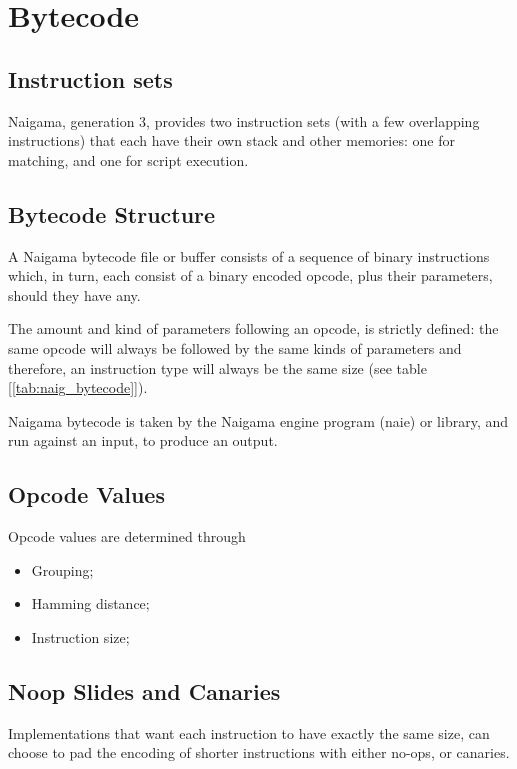 \section{Bytecode}
\label{sec:bytecode}

\subsection{Instruction sets}

Naigama, generation 3, provides two instruction sets (with a few overlapping
instructions) that each have their own stack and other memories:
one for matching, and one for script execution.



\subsection{Bytecode Structure}

A Naigama bytecode file or buffer consists of a sequence of binary
instructions which, in turn, each consist of a binary
encoded opcode, plus their parameters, should they have any.

The amount and kind of parameters following an opcode, is strictly
defined:
the same opcode will always be followed by the same kinds of parameters
and therefore, an instruction type will always be the same size
(see table [\ref{tab:naig_bytecode}]).

Naigama bytecode is taken by the Naigama engine program (naie) or
library, and run against an input, to produce an output.

\subsection{Opcode Values}

Opcode values are determined through

\begin{itemize}
\item Grouping; 
\item Hamming distance;
\item Instruction size;
\end{itemize}

\subsection{Noop Slides and Canaries}

Implementations that want each instruction to have exactly the
same size, can choose to pad the encoding of shorter instructions
with either no-ops, or canaries.

